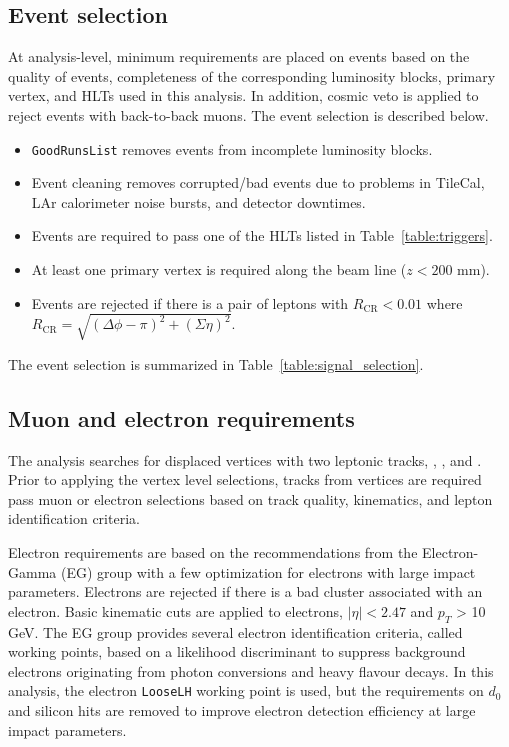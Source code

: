 \subsection{Event selection}
\label{sec:event_selection}
At analysis-level, minimum requirements are placed on events based on the quality of events, completeness of the corresponding luminosity blocks, primary vertex, and HLTs used in this analysis. In addition, cosmic veto is applied to reject events with back-to-back muons. The event selection is described below.

\begin{itemize}
    \item \texttt{GoodRunsList} removes events from incomplete luminosity blocks.
    \item Event cleaning removes corrupted/bad events due to problems in TileCal, LAr calorimeter noise bursts, and detector downtimes.
    \item Events are required to pass one of the HLTs listed in Table~\ref{table:triggers}.
    \item At least one primary vertex is required along the beam line ($z<200$ \si{\mm}).
    \item Events are rejected if there is a pair of leptons with $R_{\mathrm{CR}} < 0.01$ where $R_{\mathrm{CR}} = \sqrt{(\Delta \phi - \pi)^{2} + (\Sigma \eta)^{2}}$.
\end{itemize}

The event selection is summarized in Table~\ref{table:signal_selection}.


\subsection{Muon and electron requirements}
\label{sec:muon_electron_selection}

The analysis searches for displaced vertices with two leptonic tracks, \mumu, \ee, and \emu. Prior to applying the vertex level selections, tracks from vertices are required pass muon or electron selections based on track quality, kinematics, and lepton identification criteria. 

Electron requirements are based on the recommendations from the Electron-Gamma (EG) group with a few optimization for electrons with large impact parameters. Electrons are rejected if there is a bad cluster associated with an electron. Basic kinematic cuts are applied to electrons, $|\eta| < 2.47$ and $p_{T}$ > 10 GeV. The EG group provides several electron identification criteria, called working points, based on a likelihood discriminant to suppress background electrons originating from photon conversions and heavy flavour decays. In this analysis, the electron \texttt{LooseLH} working point is used, but the requirements on $d_{0}$ and silicon hits are removed to improve electron detection efficiency at large impact parameters.

